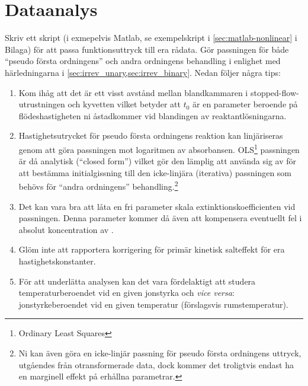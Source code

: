 \section{Dataanalys}
\label{sec:analys}
Skriv ett skript (i exmepelvis Matlab, se exempelskript i
\cref{sec:matlab-nonlinear} i Bilaga) för att passa funktionsuttryck 
till era rådata. Gör passningen för både ``pseudo första ordningens''
och andra ordningens behandling i enlighet med härledningarna i
\cref{sec:irrev_unary,sec:irrev_binary}. Nedan följer några tips:

\begin{enumerate}
\item Kom ihåg att det är ett visst
  avstånd mellan blandkammaren i stopped-flow-utrustningen och
  kyvetten vilket betyder att $t_0$ är en parameter beroende på
  flödeshastigheten ni åstadkommer vid blandingen av reaktantlösningarna.
\item Hastighetsutrycket för pseudo första ordningens reaktion kan
  linjäriseras genom att göra passningen mot logaritmen av
  absorbansen. OLS\footnote{Ordinary Least Squares} passningen är
  då analytisk (``closed form'') vilket gör den lämplig att använda sig av för
  att bestämma initialgissning till den icke-linjära (iterativa)
  passningen som behövs för ``andra ordningens'' behandling.\footnote{
  Ni kan även göra en icke-linjär passning för pseudo första ordningens
  uttryck,   utgåendes från otransformerade data, dock kommer det
  troligtvis endast ha en marginell effekt på erhållna parametrar.}
\item Det kan vara bra att låta en fri parameter skala
  extinktionskoefficienten vid passningen. Denna parameter kommer då även
  att kompensera eventuellt fel i absolut koncentration av .
\item Glöm inte att rapportera korrigering för primär kinetisk salteffekt
  för era hastighetskonstanter.
\item För att underlätta analysen kan det vara fördelaktigt att studera
  temperaturberoendet vid en given jonstyrka och {\em vice versa}:
  jonstyrkeberoendet vid en given temperatur (förslagsvis rumstemperatur).
\end{enumerate}


